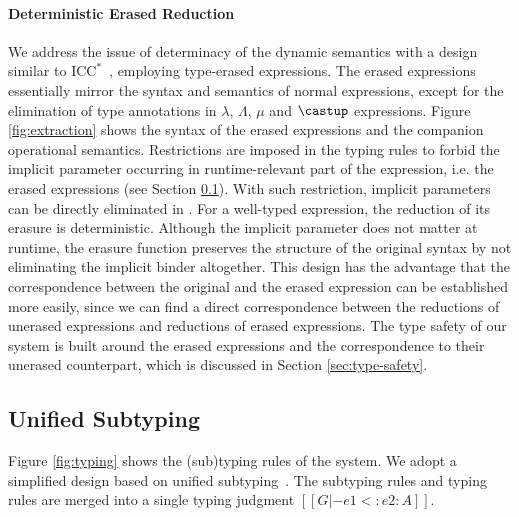 \paragraph{Deterministic Erased Reduction}
We address the issue of determinacy of the dynamic semantics with
a design similar to $\mathrm{ICC}^*$~\citep{barras2008implicit},
employing type-erased expressions. The erased expressions
essentially mirror the syntax and semantics
of normal expressions, except for the elimination of type annotations in $\lambda$,
$\Lambda$, $\mu$ and $\castup$ expressions.
Figure \ref{fig:extraction} shows the syntax of the erased expressions and
the companion operational semantics. Restrictions are imposed in the
typing rules to forbid the implicit parameter occurring in runtime-relevant part
of the expression, i.e. the erased expressions (see Section \ref{sec:type-system}).
With such restriction, implicit parameters can be directly eliminated in
.
For a well-typed expression, the reduction of
its erasure is deterministic.
Although the implicit parameter does not matter at runtime, the erasure
function preserves the structure of the original syntax
by not eliminating the implicit binder altogether. This design
has the advantage that the correspondence
between the original and the erased expression can be established more easily,
since we can find a direct correspondence between
the reductions of unerased expressions and reductions of erased expressions.
The type safety of our system is built around the erased expressions and the
correspondence to their unerased counterpart, which is discussed in Section \ref{sec:type-safety}.

\subsection{Unified Subtyping}
\label{sec:type-system}

Figure \ref{fig:typing} shows the (sub)typing rules of the system. We adopt a
simplified design based on unified subtyping~\citep{full}. The subtyping rules and
typing rules are merged into a single typing judgment $[[G |- e1 <: e2 : A]]$.

